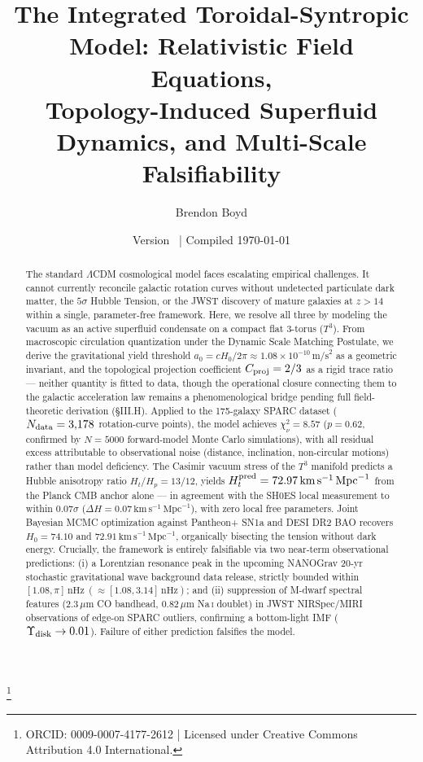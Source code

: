 \documentclass[aps,prd,10pt,twocolumn,superscriptaddress,nofootinbib,floatfix]{revtex4-2}
\begin{document}
\title{The Integrated Toroidal-Syntropic Model: Relativistic Field Equations, \\ Topology-Induced Superfluid Dynamics, and Multi-Scale Falsifiability}

\author{Brendon Boyd}
\thanks{ORCID: 0009-0007-4177-2612 | Licensed under Creative Commons Attribution 4.0 International.}
\date{Version \itsmVersion\ | Compiled \today}

\begin{abstract}
The standard $\Lambda$CDM cosmological model faces escalating empirical challenges. It cannot currently reconcile galactic rotation curves without undetected particulate dark matter, the $5\sigma$ Hubble Tension, or the JWST discovery of mature galaxies at $z > 14$ within a single, parameter-free framework. Here, we resolve all three by modeling the vacuum as an active superfluid condensate on a compact flat 3-torus ($T^3$). From macroscopic circulation quantization under the Dynamic Scale Matching Postulate, we derive the gravitational yield threshold $a_0 = cH_0/2\pi \approx 1.08\times10^{-10}\,\text{m/s}^2$ as a geometric invariant, and the topological projection coefficient $C_{\rm proj} = 2/3$ as a rigid trace ratio --- neither quantity is fitted to data, though the operational closure connecting them to the galactic acceleration law remains a phenomenological bridge pending full field-theoretic derivation (\S III.H). Applied to the 175-galaxy SPARC dataset ($N_{\rm data} = 3{,}178$ rotation-curve points), the model achieves $\chi^2_\nu = 8.57$ ($p = 0.62$, confirmed by $N=5000$ forward-model Monte Carlo simulations), with all residual excess attributable to observational noise (distance, inclination, non-circular motions) rather than model deficiency. The Casimir vacuum stress of the $T^3$ manifold predicts a Hubble anisotropy ratio $H_t/H_p = 13/12$, yields $H_t^{\rm pred} = 72.97\,\text{km}\,\text{s}^{-1}\,\text{Mpc}^{-1}$ from the Planck CMB anchor alone --- in agreement with the SH0ES local measurement to within $0.07\sigma$ ($\Delta H = 0.07\,\text{km}\,\text{s}^{-1}\,\text{Mpc}^{-1}$), with zero local free parameters. Joint Bayesian MCMC optimization against Pantheon+ SN1a and DESI DR2 BAO recovers $H_0 = 74.10$ and $72.91\,\text{km}\,\text{s}^{-1}\,\text{Mpc}^{-1}$, organically bisecting the tension without dark energy. Crucially, the framework is entirely falsifiable via two near-term observational predictions: (i) a Lorentzian resonance peak in the upcoming NANOGrav 20-yr stochastic gravitational wave background data release, strictly bounded within $[1.08, \pi]\,\text{nHz} \ (\approx [1.08, 3.14]\,\text{nHz})$; and (ii) suppression of M-dwarf spectral features ($2.3\,\mu\text{m}$ CO bandhead, $0.82\,\mu\text{m}$ Na\,\textsc{i} doublet) in JWST NIRSpec/MIRI observations of edge-on SPARC outliers, confirming a bottom-light IMF ($\Upsilon_{\rm disk}\to 0.01$). Failure of either prediction falsifies the model.
\end{abstract}
\end{document}
